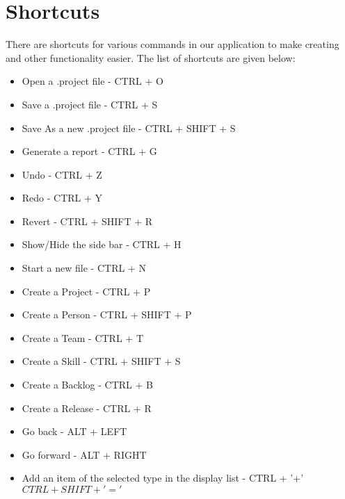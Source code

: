 \section{Shortcuts}

There are shortcuts for various commands in our application to make creating and other functionality easier. The list of shortcuts are given below:

\begin{itemize}
\item Open a .project file - CTRL + O
\item Save a .project file - CTRL + S
\item Save As a new .project file - CTRL + SHIFT + S
\item Generate a report - CTRL + G
\item Undo - CTRL + Z
\item Redo - CTRL + Y
\item Revert - CTRL + SHIFT + R
\item Show/Hide the side bar - CTRL + H
\item Start a new file - CTRL + N
\item Create a Project - CTRL + P
\item Create a Person - CTRL + SHIFT + P
\item Create a Team - CTRL + T
\item Create a Skill - CTRL + SHIFT + S
\item Create a Backlog - CTRL + B
\item Create a Release - CTRL + R
\item Go back - ALT + LEFT
\item Go forward - ALT + RIGHT
\item Add an item of the selected type in the display list - CTRL + '+' \(CTRL + SHIFT + '='\)
\end{itemize}